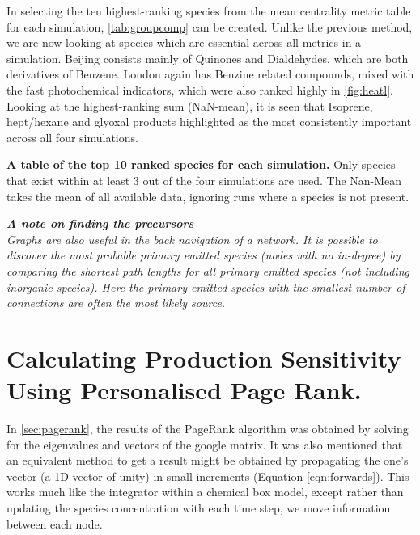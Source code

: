 In selecting the ten highest-ranking species from the mean centrality metric table for each simulation, \autoref{tab:groupcomp} can be created. Unlike the previous method, we are now looking at species which are essential across all metrics in a simulation.
Beijing consists mainly of Quinones and Dialdehydes, which are both derivatives of Benzene. London again has Benzine related compounds, mixed with the fast photochemical indicators, which were also ranked highly in \autoref{fig:heatl}. Looking at the highest-ranking sum (NaN-mean), it is seen that Isoprene, hept/hexane and glyoxal products highlighted as the most consistently important across all four simulations.

\begin{table}[H]
\centering
\small

\caption{\textbf{A table of the top 10 ranked species for each simulation.} Only species that exist within at least 3 out of the four simulations are used. The Nan-Mean takes the mean of all available data, ignoring runs where a species is not present.}
\label{tab:groupcomp}
\end{table}



\textit{\textbf{A note on finding the precursors}\\ Graphs are also useful in the back navigation of a network. It is possible to discover the most probable primary emitted species (nodes with no in-degree) by comparing the shortest path lengths for all primary emitted species (not including inorganic species). Here the primary emitted species with the smallest number of connections are often the most likely source.}




\section{Calculating Production Sensitivity Using Personalised Page Rank.}

In \autoref{sec:pagerank}, the results of the PageRank algorithm was obtained by solving for the eigenvalues and vectors of the google matrix. It was also mentioned that an equivalent method to get a result might be obtained by propagating the one's vector (a 1D vector of unity) in small increments (Equation \autoref{eqn:forwards}). This works much like the integrator within a chemical box model, except rather than updating the species concentration with each time step, we move information between each node.

